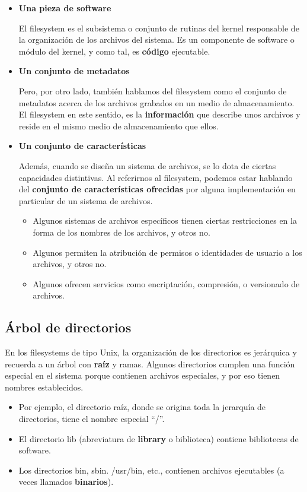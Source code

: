 \documentclass[spanish,A4,]{article}
\begin{document}
\begin{itemize}
\item
  \textbf{Una pieza de software}

  El filesystem es el subsistema o conjunto de rutinas del kernel
  responsable de la organización de los archivos del sistema. Es un
  componente de software o módulo del kernel, y como tal, es
  \textbf{código} ejecutable.
\item
  \textbf{Un conjunto de metadatos}

  Pero, por otro lado, también hablamos del filesystem como el conjunto
  de metadatos acerca de los archivos grabados en un medio de
  almacenamiento. El filesystem en este sentido, es la
  \textbf{información} que describe unos archivos y reside en el mismo
  medio de almacenamiento que ellos.
\item
  \textbf{Un conjunto de características}

  Además, cuando se diseña un sistema de archivos, se lo dota de ciertas
  capacidades distintivas. Al referirnos al filesystem, podemos estar
  hablando del \textbf{conjunto de características ofrecidas} por alguna
  implementación en particular de un sistema de archivos.

  \begin{itemize}
  \itemsep1pt\parskip0pt
  \item
    Algunos sistemas de archivos específicos tienen ciertas
    restricciones en la forma de los nombres de los archivos, y otros
    no.
  \item
    Algunos permiten la atribución de permisos o identidades de usuario
    a los archivos, y otros no.
  \item
    Algunos ofrecen servicios como encriptación, compresión, o
    versionado de archivos.
  \end{itemize}
\end{itemize}

\subsection{Árbol de directorios}\label{uxe1rbol-de-directorios}

En los filesystems de tipo Unix, la organización de los directorios es
jerárquica y recuerda a un árbol con \textbf{raíz} y ramas. Algunos
directorios cumplen una función especial en el sistema porque contienen
archivos especiales, y por eso tienen nombres establecidos.

\begin{itemize}
\itemsep1pt\parskip0pt
\item
  Por ejemplo, el directorio raíz, donde se origina toda la jerarquía de
  directorios, tiene el nombre especial ``/''.
\item
  El directorio lib (abreviatura de \textbf{library} o biblioteca)
  contiene bibliotecas de software.
\item
  Los directorios bin, sbin. /usr/bin, etc., contienen archivos
  ejecutables (a veces llamados \textbf{binarios}).
\end{itemize}
\end{document}
